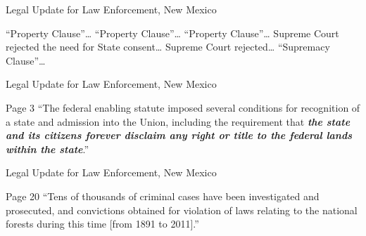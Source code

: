 \begin{frame}{Legal Update for Law Enforcement, New Mexico}
    \begin{varblock}[.9\textwidth]{}
        ``Property Clause''\ldots
        ``Property Clause''\ldots
        ``Property Clause''\ldots
        Supreme Court rejected the need for State consent\ldots
        Supreme Court rejected\ldots
        ``Supremacy Clause''\ldots
    \end{varblock}
\end{frame}

\begin{frame}{Legal Update for Law Enforcement, New Mexico}
    \begin{varblock}[.9\textwidth]{Page 3}
        ``The federal enabling statute imposed several conditions for
        recognition of a state and admission into the Union, including the
        requirement that \textbf{\emph{the state and its citizens forever
        disclaim any right or title to the federal lands within the state}}.''
    \end{varblock}
\end{frame}

\begin{frame}{Legal Update for Law Enforcement, New Mexico}
    \begin{varblock}[.9\textwidth]{Page 20}
        ``Tens of thousands of criminal cases have been investigated and
        prosecuted, and convictions obtained for violation of laws relating to
        the national forests during this time [from 1891 to 2011].''
    \end{varblock}
\end{frame}


